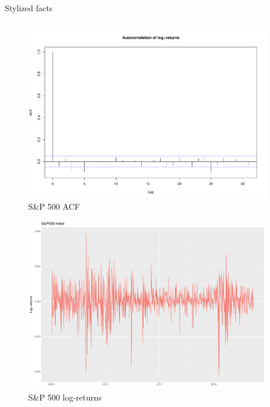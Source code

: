 \documentclass{beamer} %
\begin{document}
\begin{frame}{Stylized facts}

	\begin{columns}
		\begin{column}{.5\textwidth}
			\begin{figure}
				\includegraphics[width=.65\textwidth]
				{../Draft/img/finData/acfDailyLogRet}
				\caption{S\&P 500 ACF}
			\end{figure}
			
			\vspace{-.5cm}
			\begin{figure}
				\includegraphics[width=.65\textwidth]
				{../Draft/img/finData/logReturns}
				\caption{S\&P 500 log-returns}
			\end{figure}
		\end{column}
		
		\begin{column}{.5\textwidth}
					

\end{column}
\end{columns}
\end{frame}
\end{document}
